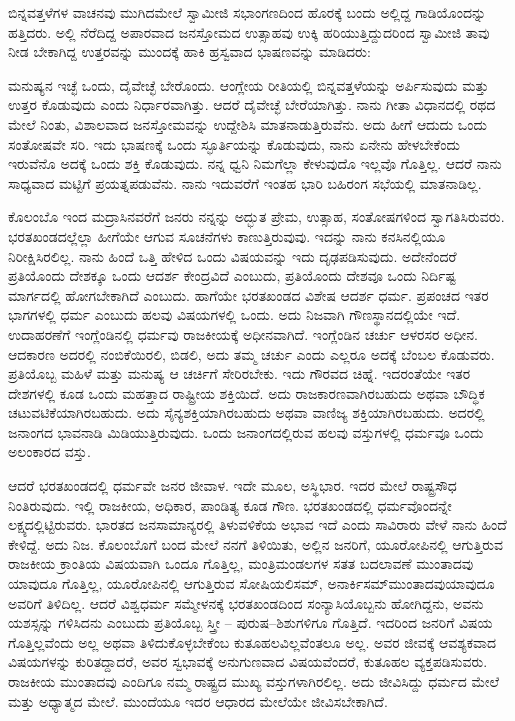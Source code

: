 \vskip 0.2cm

ಬಿನ್ನವತ್ತಳೆಗಳ ವಾಚನವು ಮುಗಿದಮೇಲೆ ಸ್ವಾಮೀಜಿ ಸಭಾಂಗಣದಿಂದ ಹೊರಕ್ಕೆ ಬಂದು ಅಲ್ಲಿದ್ದ ಗಾಡಿಯೊಂದನ್ನು ಹತ್ತಿದರು. ಅಲ್ಲಿ ನೆರೆದಿದ್ದ ಅಪಾರವಾದ ಜನಸ್ತೋಮದ ಉತ್ಸಾಹವು ಉಕ್ಕಿ ಹರಿಯುತ್ತಿದ್ದುದರಿಂದ ಸ್ವಾಮೀಜಿ ತಾವು ನೀಡ ಬೇಕಾಗಿದ್ದ ಉತ್ತರವನ್ನು ಮುಂದಕ್ಕೆ ಹಾಕಿ ಹ್ರಸ್ವವಾದ ಭಾಷಣವನ್ನು ಮಾಡಿದರು:

\vskip 0.2cm

ಮನುಷ್ಯನ ಇಚ್ಛೆ ಒಂದು, ದೈವೇಚ್ಛೆ ಬೇರೊಂದು. ಆಂಗ್ಲೇಯ ರೀತಿಯಲ್ಲಿ ಬಿನ್ನವತ್ತಳೆಯನ್ನು ಅರ್ಪಿಸುವುದು ಮತ್ತು ಉತ್ತರ ಕೊಡುವುದು ಎಂದು ನಿರ್ಧಾರವಾಗಿತ್ತು. ಆದರೆ ದೈವೇಚ್ಛೆ ಬೇರೆಯಾಗಿತ್ತು. ನಾನು ಗೀತಾ ವಿಧಾನದಲ್ಲಿ ರಥದ ಮೇಲೆ ನಿಂತು, ವಿಶಾಲವಾದ ಜನಸ್ತೋಮವನ್ನು ಉದ್ದೇಶಿಸಿ ಮಾತನಾಡುತ್ತಿರುವೆನು. ಅದು ಹೀಗೆ ಆದುದು ಒಂದು ಸಂತೋಷವೇ ಸರಿ. ಇದು ಭಾಷಣಕ್ಕೆ ಒಂದು ಸ್ಫೂರ್ತಿಯನ್ನು ಕೊಡುವುದು, ನಾನು ಏನೇನು ಹೇಳಬೇಕೆಂದು ಇರುವೆನೊ ಅದಕ್ಕೆ ಒಂದು ಶಕ್ತಿ ಕೊಡುವುದು. ನನ್ನ ಧ್ವನಿ ನಿಮಗೆಲ್ಲಾ ಕೇಳುವುದೊ ಇಲ್ಲವೊ ಗೊತ್ತಿಲ್ಲ. ಆದರೆ ನಾನು ಸಾಧ್ಯವಾದ ಮಟ್ಟಿಗೆ ಪ್ರಯತ್ನಪಡುವೆನು. ನಾನು ಇದುವರೆಗೆ ಇಂತಹ ಭಾರಿ ಬಹಿರಂಗ ಸಭೆಯಲ್ಲಿ ಮಾತನಾಡಿಲ್ಲ.

\vskip 0.2cm

ಕೊಲಂಬೊ ಇಂದ ಮದ್ರಾಸಿನವರೆಗೆ ಜನರು ನನ್ನನ್ನು ಅದ್ಭುತ ಪ್ರೇಮ, ಉತ್ಸಾಹ, ಸಂತೋಷಗಳಿಂದ ಸ್ವಾಗತಿಸಿರುವರು. ಭರತಖಂಡದಲ್ಲೆಲ್ಲಾ ಹೀಗೆಯೇ ಆಗುವ ಸೂಚನೆಗಳು ಕಾಣುತ್ತಿರುವುವು. ಇದನ್ನು ನಾನು ಕನಸಿನಲ್ಲಿಯೂ ನಿರೀಕ್ಷಿಸಿರಲಿಲ್ಲ. ನಾನು ಹಿಂದೆ ಒತ್ತಿ ಹೇಳಿದ ಒಂದು ವಿಷಯವನ್ನು ಇದು ದೃಢಪಡಿಸುವುದು. ಅದೇನೆಂದರೆ ಪ್ರತಿಯೊಂದು ದೇಶಕ್ಕೂ ಒಂದು ಆದರ್ಶ ಕೇಂದ್ರವಿದೆ ಎಂಬುದು, ಪ್ರತಿಯೊಂದು ದೇಶವೂ ಒಂದು ನಿರ್ದಿಷ್ಟ ಮಾರ್ಗದಲ್ಲಿ ಹೋಗಬೇಕಾಗಿದೆ ಎಂಬುದು. ಹಾಗೆಯೇ ಭರತಖಂಡದ ವಿಶೇಷ ಆದರ್ಶ ಧರ್ಮ. ಪ್ರಪಂಚದ ಇತರ ಭಾಗಗಳಲ್ಲಿ ಧರ್ಮ ಎಂಬುದು ಹಲವು ವಿಷಯಗಳಲ್ಲಿ ಒಂದು. ಅದು ನಿಜವಾಗಿ ಗೌಣಸ್ಥಾನದಲ್ಲಿಯೇ ಇದೆ. ಉದಾಹರಣೆಗೆ ಇಂಗ್ಲೆಂಡಿನಲ್ಲಿ ಧರ್ಮವು ರಾಜಕೀಯಕ್ಕೆ ಅಧೀನವಾಗಿದೆ. ಇಂಗ್ಲೆಂಡಿನ ಚರ್ಚು ಆಳರಸರ ಅಧೀನ. ಆದಕಾರಣ ಅದರಲ್ಲಿ ನಂಬಿಕೆಯಿರಲಿ, ಬಿಡಲಿ, ಅದು ತಮ್ಮ ಚರ್ಚು ಎಂದು ಎಲ್ಲರೂ ಅದಕ್ಕೆ ಬೆಂಬಲ ಕೊಡುವರು. ಪ್ರತಿಯೊಬ್ಬ ಮಹಿಳೆ ಮತ್ತು ಮನುಷ್ಯ ಆ ಚರ್ಚಿಗೆ ಸೇರಿರಬೇಕು. ಇದು ಗೌರವದ ಚಿಹ್ನೆ. ಇದರಂತೆಯೇ ಇತರ ದೇಶಗಳಲ್ಲಿ ಕೂಡ ಒಂದು ಮಹತ್ತಾದ ರಾಷ್ಟ್ರೀಯ ಶಕ್ತಿಯಿದೆ. ಅದು ರಾಜಕಾರಣವಾಗಿರಬಹುದು ಅಥವಾ ಬೌದ್ಧಿಕ ಚಟುವಟಿಕೆಯಾಗಿರಬಹುದು. ಅದು ಸೈನ್ಯಶಕ್ತಿಯಾಗಿರಬಹುದು ಅಥವಾ ವಾಣಿಜ್ಯ ಶಕ್ತಿಯಾಗಿರಬಹುದು. ಅದರಲ್ಲಿ ಜನಾಂಗದ ಭಾವನಾಡಿ ಮಿಡಿಯುತ್ತಿರುವುದು. ಒಂದು ಜನಾಂಗದಲ್ಲಿರುವ ಹಲವು ವಸ್ತುಗಳಲ್ಲಿ ಧರ್ಮವೂ ಒಂದು ಅಲಂಕಾರದ ವಸ್ತು.

\vskip 0.2cm

ಆದರೆ ಭರತಖಂಡದಲ್ಲಿ ಧರ್ಮವೇ ಜನರ ಜೀವಾಳ. ಇದೇ ಮೂಲ, ಅಸ್ಥಿಭಾರ. ಇದರ ಮೇಲೆ ರಾಷ್ಟ್ರಸೌಧ ನಿಂತಿರುವುದು. ಇಲ್ಲಿ ರಾಜಕೀಯ, ಅಧಿಕಾರ, ಪಾಂಡಿತ್ಯ ಕೂಡ ಗೌಣ. ಭರತಖಂಡದಲ್ಲಿ ಧರ್ಮವೊಂದನ್ನೇ ಲಕ್ಷ್ಯದಲ್ಲಿಟ್ಟಿರುವರು. ಭಾರತದ ಜನ\-ಸಾಮಾನ್ಯರಲ್ಲಿ ತಿಳುವಳಿಕೆಯ ಅಭಾವ ಇದೆ ಎಂದು ಸಾವಿರಾರು ವೇಳೆ ನಾನು ಹಿಂದೆ ಕೇಳಿದ್ದೆ. ಅದು ನಿಜ. ಕೊಲಂಬೊಗೆ ಬಂದ ಮೇಲೆ ನನಗೆ ತಿಳಿಯಿತು, ಅಲ್ಲಿನ ಜನರಿಗೆ, ಯೂರೋಪಿನಲ್ಲಿ ಆಗುತ್ತಿರುವ ರಾಜಕೀಯ ಕ್ರಾಂತಿಯ ವಿಷಯವಾಗಿ ಒಂದೂ ಗೊತ್ತಿಲ್ಲ, ಮಂತ್ರಿಮಂಡಲಗಳ ಸತತ ಬದಲಾವಣೆ ಮುಂತಾದವು ಯಾವುದೂ ಗೊತ್ತಿಲ್ಲ, ಯೂರೋಪಿನಲ್ಲಿ ಆಗುತ್ತಿರುವ ಸೋಷಿಯಲಿಸಮ್​, ಅನಾರ್ಕಿಸಮ್​ ಮುಂತಾದವು\break ಯಾವುದೂ ಅವರಿಗೆ ತಿಳಿದಿಲ್ಲ. ಆದರೆ ವಿಶ್ವಧರ್ಮ ಸಮ್ಮೇಳನಕ್ಕೆ ಭರತಖಂಡದಿಂದ ಸಂನ್ಯಾಸಿಯೊಬ್ಬನು ಹೋಗಿದ್ದನು, ಅವನು ಯಶಸ್ಸನ್ನು ಗಳಿಸಿದನು ಎಂಬುದು ಪ್ರತಿಯೊಬ್ಬ ಸ್ತ್ರೀ – ಪುರುಷ–ಶಿಶುಗಳಿಗೂ ಗೊತ್ತಿದೆ. ಇದರಿಂದ ಜನರಿಗೆ ವಿಷಯ ಗೊತ್ತಿಲ್ಲವೆಂದು ಅಲ್ಲ ಅಥವಾ ತಿಳಿದುಕೊಳ್ಳಬೇಕೆಂಬ ಕುತೂಹಲವಿಲ್ಲವೆಂತಲೂ ಅಲ್ಲ. ಅವರ ಜೀವಕ್ಕೆ ಆವಶ್ಯಕವಾದ ವಿಷಯಗಳನ್ನು ಕುರಿತದ್ದಾದರೆ, ಅವರ ಸ್ವಭಾವಕ್ಕೆ ಅನುಗುಣವಾದ ವಿಷಯವೆಂದರೆ, ಕುತೂಹಲ ವ್ಯಕ್ತಪಡಿಸುವರು. ರಾಜಕೀಯ ಮುಂತಾದವು ಎಂದಿಗೂ ನಮ್ಮ ರಾಷ್ಟ್ರದ ಮುಖ್ಯ ವಸ್ತುಗಳಾಗಿರಲಿಲ್ಲ. ಅದು ಜೀವಿಸಿದ್ದು ಧರ್ಮದ ಮೇಲೆ ಮತ್ತು ಅಧ್ಯಾತ್ಮದ ಮೇಲೆ. ಮುಂದೆಯೂ ಇದರ ಆಧಾರದ ಮೇಲೆಯೇ ಜೀವಿಸಬೇಕಾಗಿದೆ.

